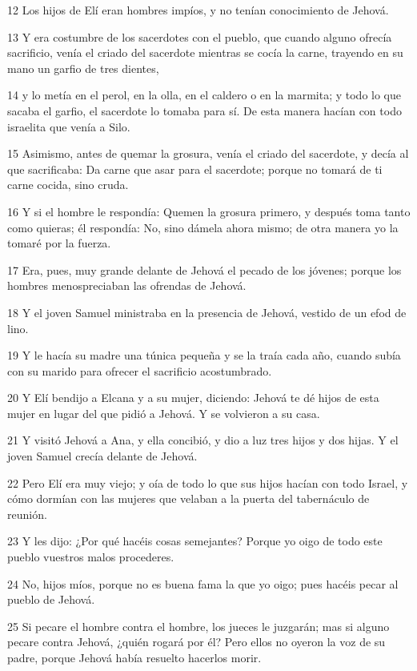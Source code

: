 \par 12 Los hijos de Elí eran hombres impíos, y no tenían conocimiento de Jehová.
\par 13 Y era costumbre de los sacerdotes con el pueblo, que cuando alguno ofrecía sacrificio, venía el criado del sacerdote mientras se cocía la carne, trayendo en su mano un garfio de tres dientes,
\par 14 y lo metía en el perol, en la olla, en el caldero o en la marmita; y todo lo que sacaba el garfio, el sacerdote lo tomaba para sí. De esta manera hacían con todo israelita que venía a Silo.
\par 15 Asimismo, antes de quemar la grosura, venía el criado del sacerdote, y decía al que sacrificaba: Da carne que asar para el sacerdote; porque no tomará de ti carne cocida, sino cruda.
\par 16 Y si el hombre le respondía: Quemen la grosura primero, y después toma tanto como quieras; él respondía: No, sino dámela ahora mismo; de otra manera yo la tomaré por la fuerza.
\par 17 Era, pues, muy grande delante de Jehová el pecado de los jóvenes; porque los hombres menospreciaban las ofrendas de Jehová.
\par 18 Y el joven Samuel ministraba en la presencia de Jehová, vestido de un efod de lino.
\par 19 Y le hacía su madre una túnica pequeña y se la traía cada año, cuando subía con su marido para ofrecer el sacrificio acostumbrado.
\par 20 Y Elí bendijo a Elcana y a su mujer, diciendo: Jehová te dé hijos de esta mujer en lugar del que pidió a Jehová. Y se volvieron a su casa.
\par 21 Y visitó Jehová a Ana, y ella concibió, y dio a luz tres hijos y dos hijas. Y el joven Samuel crecía delante de Jehová.
\par 22 Pero Elí era muy viejo; y oía de todo lo que sus hijos hacían con todo Israel, y cómo dormían con las mujeres que velaban a la puerta del tabernáculo de reunión.
\par 23 Y les dijo: ¿Por qué hacéis cosas semejantes? Porque yo oigo de todo este pueblo vuestros malos procederes.
\par 24 No, hijos míos, porque no es buena fama la que yo oigo; pues hacéis pecar al pueblo de Jehová.
\par 25 Si pecare el hombre contra el hombre, los jueces le juzgarán; mas si alguno pecare contra Jehová, ¿quién rogará por él? Pero ellos no oyeron la voz de su padre, porque Jehová había resuelto hacerlos morir.
